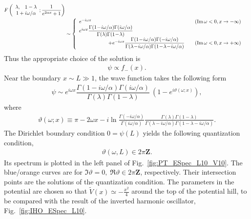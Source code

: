 \documentclass[a4paper,11pt]{article}
\newcommand{\F}[4]{
	F\left(
	\begin{array}{cc}
		#1, & #2 \\
		\multicolumn{2}{c}{#3}
	\end{array}; #4
	\right)
}
\begin{document}
\begin{align}
	\F{\lambda}{1-\lambda}
	{1+i\omega/\alpha}
	{\frac{1}{e^{2\alpha x}+1}} \notag\\
        &\sim \left\{
	\begin{array}{ll}
		e^{-i\omega x}
            &  \quad (\Im\omega<0, x \rightarrow -\infty) \\
		e^{i\omega x}
		\dfrac{\Gamma(1\!-\!i\omega/\alpha)\Gamma(i\omega/\alpha)}
		{\Gamma(\lambda)\Gamma(1\!-\!\lambda)} & \\
		\hspace{20mm}+ e^{-i\omega x}
		\dfrac{\Gamma(1\!-\!i\omega/\alpha)\Gamma(-i\omega/\alpha)}
		{\Gamma(\lambda\!-\!i\omega/\alpha)\Gamma(1\!-\!\lambda\!-\!i\omega/\alpha)}
		& \quad (\Im\omega<0, x \rightarrow +\infty)
	\end{array}
	\right.
\end{align}
Thus the appropriate choice of the solution is
\begin{align}
    \psi \propto f_-(x).
\end{align}
Near the boundary $x\sim L \gg 1$,
the wave function takes the following form
\begin{align}
    \psi
    \sim e^{i\omega x}
	\dfrac{\Gamma(1-i\omega/\alpha)\Gamma(i\omega/\alpha)}
	{\Gamma(\lambda)\Gamma(1-\lambda)}\:
	\left( 1 - e^{i\vartheta(\omega;x)} \right),
\end{align}
where
\begin{align}
	\vartheta(\omega; x)
	\equiv  \pi - 2\omega x
	-i \ln \frac{\Gamma(-i\omega/\alpha)}{\Gamma(i\omega/\alpha)}
	\frac{\Gamma(\lambda)\Gamma(1-\lambda)}
	{\Gamma(\lambda-i\omega/\alpha)\Gamma(1-\lambda-i\omega/\alpha)}.
 \label{eq:thetaPTdef}
\end{align}
The Dirichlet boundary condition $0=\psi(L)$
yields the following quantization condition,
\begin{align}
     \vartheta(\omega,L) \in 2\pi\mathbf{Z}.
     \label{eq:theta_2pi_Z_PT}
\end{align}
Its spectrum is plotted in the left panel of Fig.~\ref{fig:PT_ESpec_L10_V10}.
The blue/orange curves are for
$\Im\vartheta=0,\; \Re\vartheta\in 2\pi\mathbf{Z}$,
respectively.
Their intersection points are the solutions of the quantization condition.
%
The parameters in the potential are chosen so that $\widetilde{V}(x)\simeq -\frac{x^2}{4}$ around the top of the potential hill,
to be compared with the result of the inverted harmonic oscillator, Fig.~\ref{fig:IHO_ESpec_L10}.
\end{document}
